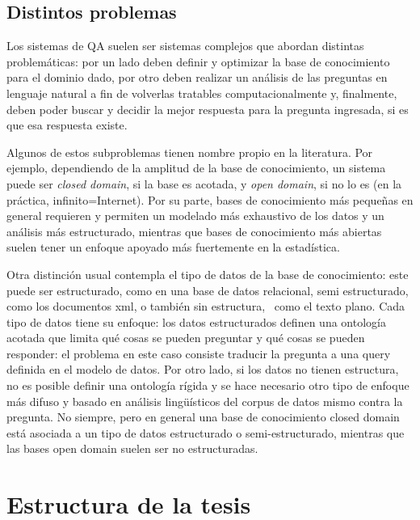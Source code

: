 \subsection{Distintos problemas}

Los sistemas de QA suelen ser sistemas complejos que abordan distintas
problem\'aticas: por un lado deben definir y optimizar la base de
conocimiento para el dominio dado, por otro deben realizar un
an\'alisis de las preguntas en lenguaje natural a fin de volverlas
tratables computacionalmente y, finalmente, deben poder buscar y
decidir la mejor respuesta para la pregunta ingresada, si es que esa
respuesta existe.


\bigskip

Algunos de estos subproblemas tienen nombre propio en la literatura. Por
ejemplo, dependiendo de la amplitud de la base de conocimiento, un
sistema puede ser \textit{closed domain}, si la base es acotada, y
\textit{open domain}, si no lo es (en la pr\'actica,
infinito=Internet). Por su parte, bases de conocimiento m\'as
peque\~nas en general requieren y permiten un modelado m\'as exhaustivo
de los datos y un an\'alisis m\'as estructurado, mientras que bases de conocimiento m\'as abiertas suelen
tener un enfoque apoyado m\'as fuertemente en la estad\'istica. 


\bigskip

Otra distinci\'on usual contempla el tipo de datos de la base de
conocimiento: este puede ser estructurado, como en una base de datos
relacional, semi estructurado, como los documentos xml, o tambi\'en sin
estructura, \ como el texto plano. Cada tipo de datos tiene su enfoque:
los datos estructurados definen una ontolog\'ia acotada que limita
qu\'e cosas se pueden preguntar y qu\'e cosas se pueden responder: el
problema en este caso consiste traducir la pregunta a una query
definida en el modelo de datos. Por otro lado, si los datos no
tienen estructura, no es posible definir una ontolog\'ia r\'igida y se
hace necesario otro tipo de enfoque m\'as difuso y basado en an\'alisis
ling\"u\'isticos del corpus de datos mismo contra la pregunta. No siempre, 
pero en general una base de conocimiento closed domain est\'a asociada
a un tipo de datos estructurado o semi-estructurado, mientras que las bases open domain
suelen ser no estructuradas.



\section{Estructura de la tesis}

